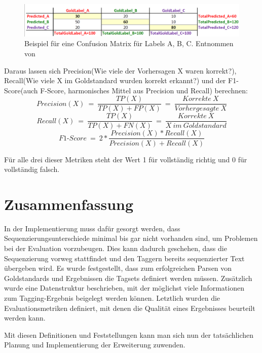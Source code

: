 \begin{figure}[htb]
	\includegraphics[width=\textwidth]{gfx/multi-class-confusionmatrix.png}
	\caption{Beispiel für eine Confusion Matrix für Labels A, B, C. Entnommen von \cite{Web:rxnlp}}
	\label{fig:intro:pos:metrics:confusion}
\end{figure}

Daraus lassen sich Precision(Wie viele der Vorhersagen X waren korrekt?), Recall(Wie viele X im Goldstandard wurden korrekt erkannt?) und der F1-Score(auch F-Score, harmonisches Mittel aus Precision und Recall) berechnen:
\[ Precision(X) \: = \: \frac{TP(X)}{TP(X)+FP(X)}\: = \: \frac{Korrekte\:X}{Vorhergesagte\:X} \]
\[ Recall(X) \: = \: \frac{TP(X)}{TP(X)+FN(X)} \: = \: \frac{Korrekte\:X}{X\:im\:Goldstandard} \]
\[ F1\mbox{-}Score \: = \: 2*\frac{Precision(X)*Recall(X)}{Precision(X)+Recall(X)} \]

Für alle drei dieser Metriken steht der Wert 1 für vollständig richtig und 0 für vollständig falsch.


\section{Zusammenfassung}
\label{sec:concept:conclusion}

In der Implementierung muss dafür gesorgt werden, dass Sequenzierungsunterschiede minimal bis gar nicht vorhanden sind, um Problemen bei der Evaluation vorzubeugen. Dies kann dadurch geschehen, dass die Sequenzierung vorweg stattfindet und den Taggern bereits sequenzierter Text übergeben wird. Es wurde festgestellt, dass zum erfolgreichen Parsen von Goldstandards und Ergebnissen die Tagsets definiert werden müssen. Zusätzlich wurde eine Datenstruktur beschrieben, mit der möglichst viele Informationen zum Tagging-Ergebnis beigelegt werden können. Letztlich wurden die Evaluationsmetriken definiert, mit denen die Qualität eines Ergebnisses beurteilt werden kann.

Mit diesen Definitionen und Feststellungen kann man sich nun der tatsächlichen Planung und Implementierung der Erweiterung zuwenden.
